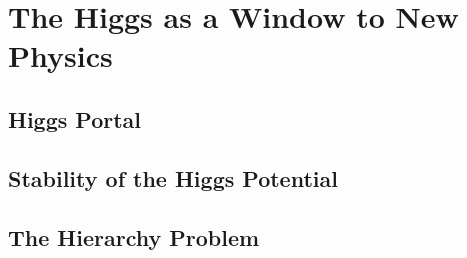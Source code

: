 
\chapter{The Higgs as a Window to New Physics}\label{chap:three}

\section{Higgs Portal}
\section{Stability of the Higgs Potential}

\section{The Hierarchy Problem}
